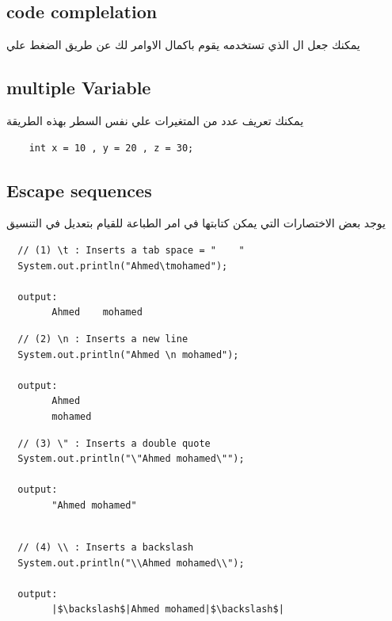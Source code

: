 \subsection{code complelation}
\begin{AR}
  يمكنك جعل ال الذي تستخدمه يقوم باكمال الاوامر لك عن طريق الضغط علي 
\end{AR}
\subsection{multiple Variable}
\begin{AR}
  يمكنك تعريف عدد من المتغيرات علي نفس السطر بهذه الطريقة
\end{AR}
\begin{verbatim}
    int x = 10 , y = 20 , z = 30;
\end{verbatim}
\subsection{Escape sequences}
\begin{AR}
  يوجد بعض الاختصارات التي يمكن كتابتها في امر الطباعة للقيام بتعديل في التنسيق
\end{AR}
\begin{verbatim}
  // (1) \t : Inserts a tab space = "    "
  System.out.println("Ahmed\tmohamed");

  output:
        Ahmed    mohamed
\end{verbatim}
\begin{verbatim}
  // (2) \n : Inserts a new line
  System.out.println("Ahmed \n mohamed");

  output:
        Ahmed    
        mohamed
\end{verbatim}
\begin{verbatim}
  // (3) \" : Inserts a double quote
  System.out.println("\"Ahmed mohamed\"");

  output:
        "Ahmed mohamed"
        
\end{verbatim}
\begin{verbatim}
  // (4) \\ : Inserts a backslash
  System.out.println("\\Ahmed mohamed\\");

  output:
        |$\backslash$|Ahmed mohamed|$\backslash$|
        
\end{verbatim}
\newpage
